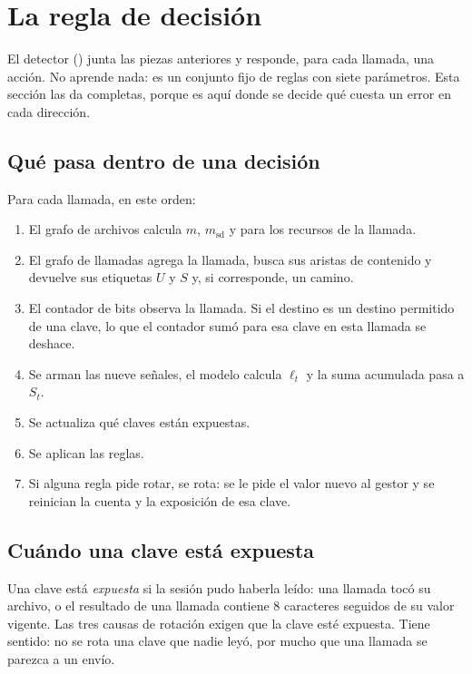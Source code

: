 \section{La regla de decisión}\label{sec:decision}

El detector () junta las piezas anteriores y responde, para cada
llamada, una acción. No aprende nada: es un conjunto fijo de reglas con siete parámetros. Esta
sección las da completas, porque es aquí donde se decide qué cuesta un error en cada dirección.

\subsection{Qué pasa dentro de una decisión}

Para cada llamada, en este orden:

\begin{enumerate}
  \item El grafo de archivos calcula $m$, $m_{\mathrm{sd}}$ y  para los recursos de la
    llamada.
  \item El grafo de llamadas agrega la llamada, busca sus aristas de contenido y devuelve sus
    etiquetas $U$ y $S$ y, si corresponde, un camino.
  \item El contador de bits observa la llamada. Si el destino es un destino permitido de una clave,
    lo que el contador sumó para esa clave en esta llamada se deshace.
  \item Se arman las nueve señales, el modelo calcula $\ell_t$ y la suma acumulada pasa a $S_t$.
  \item Se actualiza qué claves están expuestas.
  \item Se aplican las reglas.
  \item Si alguna regla pide rotar, se rota: se le pide el valor nuevo al gestor y se reinician la
    cuenta y la exposición de esa clave.
\end{enumerate}

\subsection{Cuándo una clave está expuesta}

Una clave está \emph{expuesta} si la sesión pudo haberla leído: una llamada tocó su archivo, o el
resultado de una llamada contiene 8 caracteres seguidos de su valor vigente. Las tres causas de
rotación exigen que la clave esté expuesta. Tiene sentido: no se rota una clave que nadie leyó, por
mucho que una llamada se parezca a un envío.

